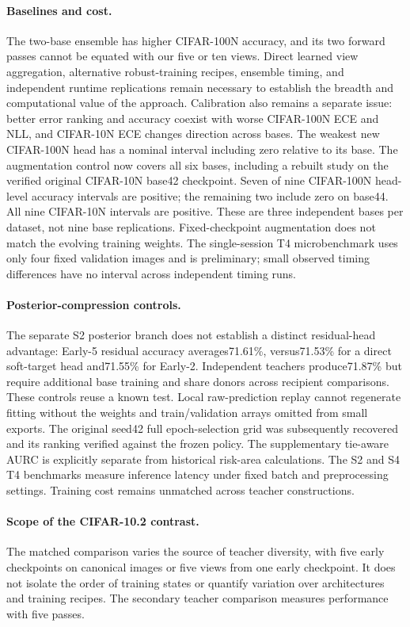 \paragraph{Baselines and cost.}
The two-base ensemble has higher CIFAR-100N accuracy, and its two forward passes cannot be equated with our five or ten views. Direct learned view aggregation, alternative robust-training recipes, ensemble timing, and independent runtime replications remain necessary to establish the breadth and computational value of the approach. Calibration also remains a separate issue: better error ranking and accuracy coexist with worse CIFAR-100N ECE and NLL, and CIFAR-10N ECE changes direction across bases. The weakest new CIFAR-100N head has a nominal interval including zero relative to its base. The augmentation control now covers all six bases, including a rebuilt study on the verified original CIFAR-10N base42 checkpoint. Seven of nine CIFAR-100N head-level accuracy intervals are positive; the remaining two include zero on base44. All nine CIFAR-10N intervals are positive. These are three independent bases per dataset, not nine base replications. Fixed-checkpoint augmentation does not match the evolving training weights. The single-session T4 microbenchmark uses only four fixed validation images and is preliminary; small observed timing differences have no interval across independent timing runs.


\paragraph{Posterior-compression controls.}
The separate S2 posterior branch does not establish a distinct residual-head
advantage: Early-5 residual accuracy averages71.61\%, versus71.53\% for a direct
soft-target head and71.55\% for Early-2. Independent teachers produce71.87\% but
require additional base training and share donors across recipient comparisons.
These controls reuse a known test. Local raw-prediction replay cannot regenerate
fitting without the weights and train/validation arrays omitted from small
exports. The original seed42 full epoch-selection grid was subsequently recovered
and its ranking verified against the frozen policy.
The supplementary tie-aware AURC is explicitly separate from historical risk-area
calculations. The S2 and S4 T4 benchmarks measure inference latency under fixed batch and preprocessing settings. Training cost remains unmatched across teacher constructions.

\paragraph{Scope of the CIFAR-10.2 contrast.}
The matched comparison varies the source of teacher diversity, with five
early checkpoints on canonical images or five views from one early
checkpoint. It does not isolate the order of training states or quantify
variation over architectures and training recipes. The secondary
teacher comparison measures performance with five passes.
